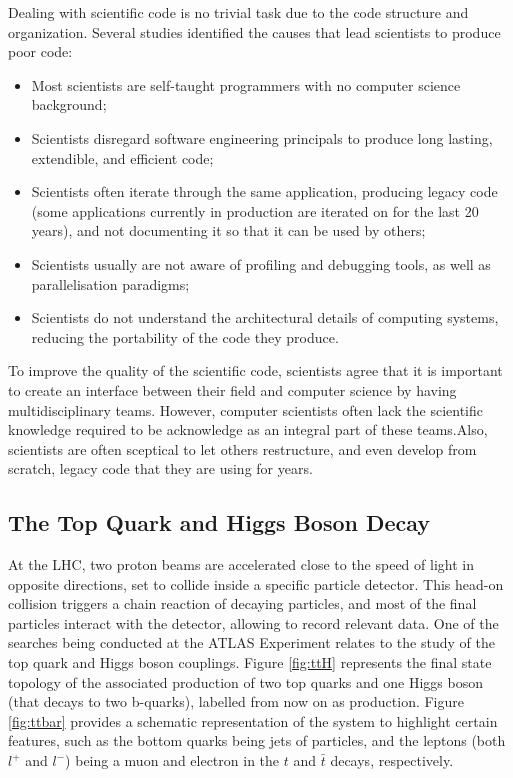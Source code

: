 Dealing with scientific code is no trivial task due to the code structure and organization. Several studies \cite{SC:Nature,SC:Develop,SC:SC11,SC:28280} identified the causes that lead scientists to produce poor code:

\begin{center}
	\begin{itemize}
		\item Most scientists are self-taught programmers with no computer science background;
		\item Scientists disregard software engineering principals to produce long lasting, extendible, and efficient code;
		\item Scientists often iterate through the same application, producing legacy code (some applications currently in production are iterated on for the last 20 years), and not documenting it so that it can be used by others;
		\item Scientists usually are not aware of profiling and debugging tools, as well as parallelisation paradigms;
		\item Scientists do not understand the architectural details of computing systems, reducing the portability of the code they produce.
	\end{itemize}
\end{center}

To improve the quality of the scientific code, scientists agree that it is important to create an interface between their field and computer science by having multidisciplinary teams. However, computer scientists often lack the scientific knowledge required to be acknowledge as an integral part of these teams.Also, scientists are often sceptical to let others restructure, and even develop from scratch, legacy code that they are using for years.

\subsection{The Top Quark and Higgs Boson Decay}
\label{ttH}

At the LHC, two proton beams are accelerated close to the speed of light in opposite directions, set to collide inside a specific particle detector. This head-on collision triggers a chain reaction of decaying particles, and most of the final particles interact with the detector, allowing to record relevant data. One of the searches being conducted at the ATLAS Experiment relates to the study of the top quark and Higgs boson couplings. Figure \ref{fig:ttH} represents the final state topology of the associated production of two top quarks and one Higgs boson (that decays to two b-quarks), labelled from now on as \ttH production. Figure \ref{fig:ttbar} provides a schematic representation of the system to highlight certain features, such as the bottom quarks being jets of particles, and the leptons (both $l^+$ and $l^-$) being a muon and electron in the $t$ and $\bar{t}$ decays, respectively.

